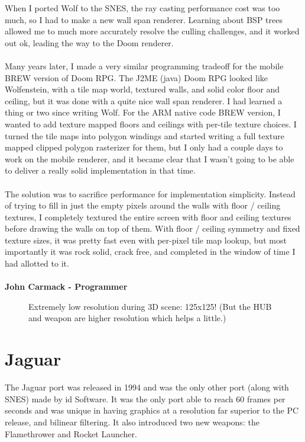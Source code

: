 \documentclass[book.tex]{subfiles}
\begin{document}
\begin{fancyquotes}
    When I ported Wolf to the SNES, the ray casting performance cost was too much, so I had to make a new wall span renderer.  Learning about BSP trees allowed me  to much more accurately resolve the culling challenges, and it worked out ok, leading the way to the Doom renderer.\\
\\
Many years later, I made a very similar programming tradeoff for the mobile BREW version of Doom RPG.  The J2ME (java) Doom RPG looked like Wolfenstein, with a tile map world, textured walls, and solid color floor and ceiling, but it was done with a quite nice wall span renderer.  I had learned a thing or two since writing Wolf.  For the ARM native code BREW version, I wanted to add texture mapped floors and ceilings with per-tile texture choices.  I turned the tile maps into polygon windings and started writing a full texture mapped clipped polygon rasterizer for them, but I only had a couple days to work on the mobile renderer, and it became clear that I wasn't going to be able to deliver a really solid implementation in that time.\\
 \\
The solution was to sacrifice performance for implementation simplicity.  Instead of trying to fill in just the empty pixels around the walls with floor / ceiling textures, I completely textured the entire screen with floor and ceiling textures before drawing the walls on top of them.  With floor / ceiling symmetry and fixed texture sizes, it was pretty fast even with per-pixel tile map lookup, but most importantly it was rock solid, crack free, and completed in the window of time I had allotted to it.\\
\\
\textbf{John Carmack - Programmer}
\end{fancyquotes}


\par
\begin{figure}[H]
\centering
 \caption{Extremely low resolution during 3D scene: 125x125! (But the HUB and weapon are higher resolution which helps a little.)}
 \end{figure}
 \par










\section{Jaguar}
The Jaguar port was released in 1994 and was the only other port (along with SNES) made by id Software. It was the only port able to reach 60 frames per seconds and was unique in having graphics at a resolution far superior to the PC release, and bilinear filtering. It also introduced two new weapons: the Flamethrower and Rocket Launcher.\\
\par
\end{document}
